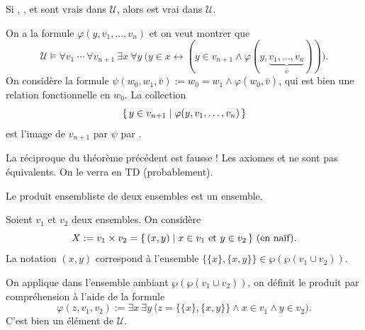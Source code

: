 \documentclass[./main]{subfiles}
\begin{document}
  \begin{prop}
    Si , ,  et  sont vrais dans  $\mathcal{U}$, alors  est vrai dans $\mathcal{U}$.
  \end{prop}
  \begin{prv}
    On a la formule $\varphi(y, v_1, \ldots, v_n)$ et on veut montrer que 
    \[
    \mathcal{U} \models \forall v_1 \: \cdots \: \forall v_{n+1} \: \exists x \: \forall y \: \big(
      y \in x \leftrightarrow (y \in v_{n+1} \land \varphi(y, \underbrace{v_1, \ldots, v_n}_{\bar{v}}))
    \big)
    .\]
    On considère la formule $\psi(w_0, w_1, \bar{v}) := w_0 = w_1 \land \varphi(w_0, \bar{v})$, qui est bien une relation fonctionnelle en $w_0$.
    La collection \[
    \mleft\{\,y \in v_{n+1} \;\middle|\; \varphi(y, v_1, \ldots, v_n)\,\mright\}
    \] est l'image de $v_{n+1}$ par $\psi$ par .
  \end{prv}

  \begin{rmk}
    La réciproque du théorème précédent est fausse ! Les axiomes  et  ne sont pas équivalents. On le verra en TD (probablement).
  \end{rmk}

  \begin{prop}
    Le produit ensembliste de deux ensembles est un ensemble.
  \end{prop}

  \begin{prv}
    Soient $v_1$ et $v_2$ deux ensembles.
    On considère \[
    X := v_1 \times v_2 = \mleft\{\,(x,y) \;\middle|\; x \in v_1 \text{ et } y \in v_2 \,\mright\} \text{ (en naïf)}
    .\] 
    La notation $(x,y)$ correspond à l'ensemble $\{\{x\} , \{x,y\}\} \in \wp(\wp(v_1 \cup v_2))$.

    On applique  dans l'ensemble ambiant  $\wp(\wp(v_1 \cup v_2))$, on définit le produit par compréhension à l'aide de la formule 
    \[
    \varphi(z, v_1, v_2) := \exists x \: \exists y \: \big(z = \{\{x\} , \{x,y\} \}  \land x \in v_1 \land y \in v_2\big)
    .\]
    C'est bien un élément de $\mathcal{U}$.
  \end{prv}
\end{document}
